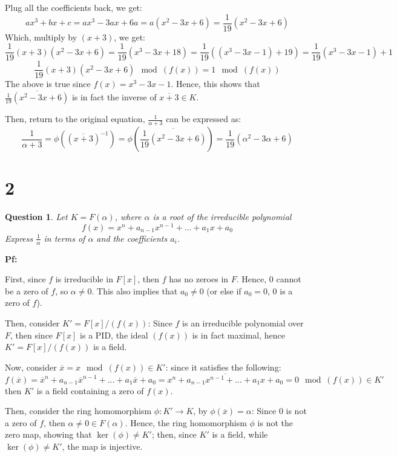 \documentclass{article}
\newtheorem{question}{Question}
\begin{document}
Plug all the coefficients back, we get:
$$ax^3+bx+c = ax^3-3ax+6a = a(x^2-3x+6)=\frac{1}{19}(x^2-3x+6)$$
Which, multiply by $(x+3)$, we get:
$$\frac{1}{19}(x+3)(x^2-3x+6)=\frac{1}{19}(x^3-3x+18) = \frac{1}{19}((x^3-3x-1)+19)=\frac{1}{19}(x^3-3x-1)+1$$
$$\frac{1}{19}(x+3)(x^2-3x+6)\mod (f(x))=1\mod (f(x))$$
The above is true since $f(x)=x^3-3x-1$. Hence, this shows that $\overline{\frac{1}{19}(x^2-3x+6)}$ is in fact the inverse of $\overline{x+3}\in K$.

Then, return to the original equation, $\frac{1}{\alpha+3}$ can be expressed as:
$$\frac{1}{\alpha+3}=\phi((\overline{x+3})^{-1})=\phi\left(\overline{\frac{1}{19}(x^2-3x+6)}\right) = \frac{1}{19}(\alpha^2-3\alpha+6)$$

\break

\section*{2}
\begin{myBox}[]{}
    \begin{question}
        Let $K=F(\alpha)$, where $\alpha$ is a root of the irreducible polynomial
        $$f(x)=x^n+a_{n-1}x^{n-1}+...+a_1x+a_0$$
        Express $\frac{1}{\alpha}$ in terms of $\alpha$ and the coefficients $a_i$.
    \end{question}
\end{myBox}

\textbf{Pf:}

First, since $f$ is irreducible in $F[x]$, then $f$ has no zeroes in $F$. Hence, $0$ cannot be a zero of $f$, so $\alpha\neq 0$. This also implies that $a_0\neq 0$ (or else if $a_0=0$, $0$ is a zero of $f$).

\hfil

Then, consider $K'=F[x]/(f(x))$: Since $f$ is an irreducible polynomial over $F$, then since $F[x]$ is a PID,
the ideal $(f(x))$ is in fact maximal, hence $K'=F[x]/(f(x))$ is a field.

Now, consider $\overline{x} = x\mod (f(x))\in K'$: since it satisfies the following: 
$$f(\overline{x})=\overline{x}^n+a_{n-1}\overline{x}^{n-1}+...+a_1\overline{x}+a_0 = \overline{x^n+a_{n-1}x^{n-1}+...+a_1x+a_0} = 0\mod (f(x))\in K'$$
then $K'$ is a field containing a zero of $f(x)$.

Then, consider the ring homomorphism $\phi: K'\rightarrow K$, by $\phi(\overline{x})=\alpha$: Since $0$ is not a zero of $f$, then $\alpha\neq 0\in F(\alpha)$.
Hence, the ring homomorphism $\phi$ is not the zero map, showing that $\ker(\phi)\neq K'$;
then, since $K'$ is a field, while $\ker(\phi)\neq K'$, the map is injective.
\end{document}
